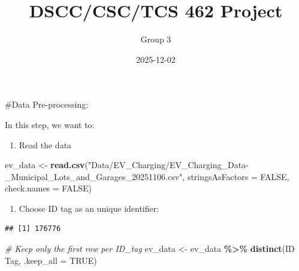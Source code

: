 \documentclass[
  12pt,
]{article}
\title{DSCC/CSC/TCS 462 Project}
\author{Group 3}
\date{2025-12-02}
\newenvironment{Shaded}{\begin{snugshade}}{\end{snugshade}}
\newcommand{\AttributeTok}[1]{\textcolor[rgb]{0.13,0.29,0.53}{#1}}
\newcommand{\CommentTok}[1]{\textcolor[rgb]{0.56,0.35,0.01}{\textit{#1}}}
\newcommand{\ConstantTok}[1]{\textcolor[rgb]{0.56,0.35,0.01}{#1}}
\newcommand{\FunctionTok}[1]{\textcolor[rgb]{0.13,0.29,0.53}{\textbf{#1}}}
\newcommand{\NormalTok}[1]{#1}
\newcommand{\OtherTok}[1]{\textcolor[rgb]{0.56,0.35,0.01}{#1}}
\newcommand{\SpecialCharTok}[1]{\textcolor[rgb]{0.81,0.36,0.00}{\textbf{#1}}}
\newcommand{\StringTok}[1]{\textcolor[rgb]{0.31,0.60,0.02}{#1}}
\providecommand{\tightlist}{%
  \setlength{\itemsep}{0pt}\setlength{\parskip}{0pt}}
\begin{document}
\maketitle

{
\setcounter{tocdepth}{2}
\tableofcontents
}
\#Data Pre-processing:

In this step, we want to:

\begin{enumerate}
\def\labelenumi{\arabic{enumi}.}
\tightlist
\item
  Read the data
\end{enumerate}

\begin{Shaded}
\begin{Highlighting}[]
\NormalTok{ev\_data }\OtherTok{\textless{}{-}} \FunctionTok{read.csv}\NormalTok{(}\StringTok{"Data/EV\_Charging/EV\_Charging\_Data{-}\_Municipal\_Lots\_and\_Garages\_20251106.csv"}\NormalTok{,}
    \AttributeTok{stringsAsFactors =} \ConstantTok{FALSE}\NormalTok{, }\AttributeTok{check.names =} \ConstantTok{FALSE}\NormalTok{)}
\end{Highlighting}
\end{Shaded}

\begin{enumerate}
\def\labelenumi{\arabic{enumi}.}
\setcounter{enumi}{1}
\tightlist
\item
  Choose ID tag as an unique identifier:
\end{enumerate}

\begin{Shaded}
\end{Shaded}

\begin{verbatim}
## [1] 176776
\end{verbatim}

\begin{Shaded}
\begin{Highlighting}[]
\CommentTok{\# Keep only the first row per ID\_tag}
\NormalTok{ev\_data }\OtherTok{\textless{}{-}}\NormalTok{ ev\_data }\SpecialCharTok{\%\textgreater{}\%}
    \FunctionTok{distinct}\NormalTok{(}\StringTok{\textasciigrave{}}\AttributeTok{ID Tag}\StringTok{\textasciigrave{}}\NormalTok{, }\AttributeTok{.keep\_all =} \ConstantTok{TRUE}\NormalTok{)}
\end{Highlighting}
\end{Shaded}
\end{document}
